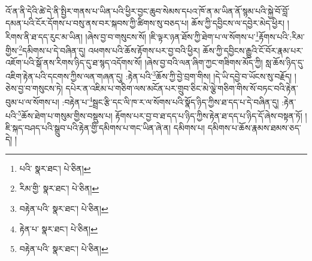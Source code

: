 འོ་ན་ནི་དེའི་ཚེ་དེ་ནི་སྤྱིར་གནས་པ་ཡིན་པའི་ཕྱིར་བྱང་ཆུབ་སེམས་དཔའ་ཁོ་ན་མ་ཡིན་ནོ་སྙམ་པའི་སྐྱེ་བོ་བློ་དམན་པའི་ངོར་དོགས་པ་བསུ་ནས་བར་སྐབས་ཀྱི་ཚིགས་སུ་བཅད་པ། ཆོས་ཀྱི་དབྱིངས་ལ་དབྱེར་མེད་ཕྱིར། །རིགས་ནི་ཐ་དད་རུང་མ་ཡིན། །ཞེས་བྱ་བ་གསུངས་སོ། །ཇི་ལྟར་ཉན་ཐོས་ཀྱི་ཐེག་པ་ལ་སོགས་པ་\footnote{པའི་  སྣར་ཐང་།  པེ་ཅིན། }རྟོགས་པའི་:རིམ་གྱིས་\footnote{རིམ་གྱི་  སྣར་ཐང་།  པེ་ཅིན། }དམིགས་པ་དེ་བཞིན་དུ། འཕགས་པའི་ཆོས་རྟོགས་པར་བྱ་བའི་ཕྱིར། ཆོས་ཀྱི་དབྱིངས་རྒྱུའི་ངོ་བོར་རྣམ་པར་འཇོག་པའི་སྒོ་ནས་རིགས་ཉིད་དུ་ཐ་སྙད་འདོགས་སོ། །ཞེས་བྱ་བའི་ལན་ཞིག་ཀྱང་གཟིགས་མོད་ཀྱི། སླ་ཆོས་ཉིད་དུ་འཇིག་རྟེན་པའི་དངགས་ཀྱིས་ལན་གཞན་དུ། :རྟེན་པའི་\footnote{བརྟེན་པའི་  སྣར་ཐང་།  པེ་ཅིན། }ཆོས་ཀྱི་བྱེ་བྲག་གིས། །དེ་ཡི་དབྱེ་བ་ཡོངས་སུ་བརྗོད། །ཅེས་བྱ་བ་གསུངས་ཏེ། དཔེར་ན་འཇིམ་པ་གཅིག་ལས་མངོན་པར་གྲུབ་ཅིང་མེ་ལྕེ་གཅིག་གིས་སོ་བཏང་བའི་རྟེན་བུམ་པ་ལ་སོགས་པ། :བརྟེན་པ་\footnote{རྟེན་པ་  སྣར་ཐང་།  པེ་ཅིན། }སྦྲང་རྩི་དང་ལི་ཁ་ར་ལ་སོགས་པའི་སྣོད་ཉིད་ཀྱིས་ཐ་དད་པ་དེ་བཞིན་དུ། :རྟེན་པའི་\footnote{བརྟེན་པའི་  སྣར་ཐང་།  པེ་ཅིན། }ཆོས་ཐེག་པ་གསུམ་གྱིས་བསྡུས་པ། རྟོགས་པར་བྱ་བ་ཐ་དད་པ་ཉིད་ཀྱིས་རྟེན་ཐ་དད་པ་ཉིད་དོ་ཞེས་བསྟན་ཏོ། །ཇི་སྐད་བཤད་པའི་སྒྲུབ་པའི་རྟེན་གྱི་དམིགས་པ་གང་ཡིན་ཞེ་ན། དམིགས་པ། དམིགས་པ་ཆོས་རྣམས་ཐམས་ཅད་དེ། །
